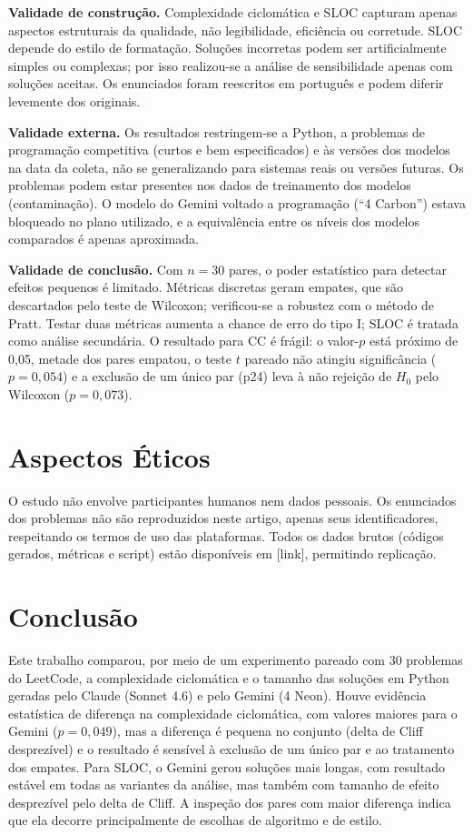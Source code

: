 \documentclass[12pt]{article}
\begin{document}
\textbf{Validade de construção.} Complexidade ciclomática e SLOC capturam apenas aspectos
estruturais da qualidade, não legibilidade, eficiência ou corretude. SLOC depende do estilo
de formatação. Soluções incorretas podem ser artificialmente simples ou complexas; por isso
realizou-se a análise de sensibilidade apenas com soluções aceitas. Os enunciados foram reescritos em português
e podem diferir levemente dos originais.

\textbf{Validade externa.} Os resultados restringem-se a Python, a problemas de
programação competitiva (curtos e bem especificados) e às versões dos modelos na data da
coleta, não se generalizando para sistemas reais ou versões futuras. Os problemas podem
estar presentes nos dados de treinamento dos modelos (contaminação). O modelo do Gemini
voltado a programação (``4 Carbon'') estava bloqueado no plano utilizado, e a equivalência entre
os níveis dos modelos comparados é apenas aproximada.

\textbf{Validade de conclusão.} Com $n = 30$ pares, o poder estatístico para detectar
efeitos pequenos é limitado. Métricas discretas geram empates, que são descartados pelo
teste de Wilcoxon; verificou-se a robustez com o método de Pratt. Testar duas métricas
aumenta a chance de erro do tipo I; SLOC é tratada como análise secundária. O resultado
para CC é frágil: o valor-$p$ está próximo de 0,05, metade dos pares empatou, o teste $t$
pareado não atingiu significância ($p = 0{,}054$) e a exclusão de um único par (p24) leva à
não rejeição de $H_0$ pelo Wilcoxon ($p = 0{,}073$).

\section{Aspectos Éticos}
O estudo não envolve participantes humanos nem dados pessoais. Os enunciados dos problemas
não são reproduzidos neste artigo, apenas seus identificadores, respeitando os termos de uso
das plataformas. Todos os dados brutos (códigos gerados, métricas e script) estão disponíveis
em [link], permitindo replicação. %

\section{Conclusão}
Este trabalho comparou, por meio de um experimento pareado com 30 problemas do LeetCode, a
complexidade ciclomática e o tamanho das soluções em Python geradas pelo Claude (Sonnet 4.6) e
pelo Gemini (4 Neon). Houve evidência estatística de diferença na complexidade ciclomática, com
valores maiores para o Gemini ($p = 0{,}049$), mas a diferença é pequena no conjunto (delta de
Cliff desprezível) e o resultado é sensível à exclusão de um único par e ao tratamento dos
empates. Para SLOC, o Gemini gerou soluções mais longas, com resultado estável em todas as
variantes da análise, mas também com tamanho de efeito desprezível pelo delta de Cliff. A
inspeção dos pares com maior diferença indica que ela decorre principalmente de escolhas de
algoritmo e de estilo.
\end{document}
